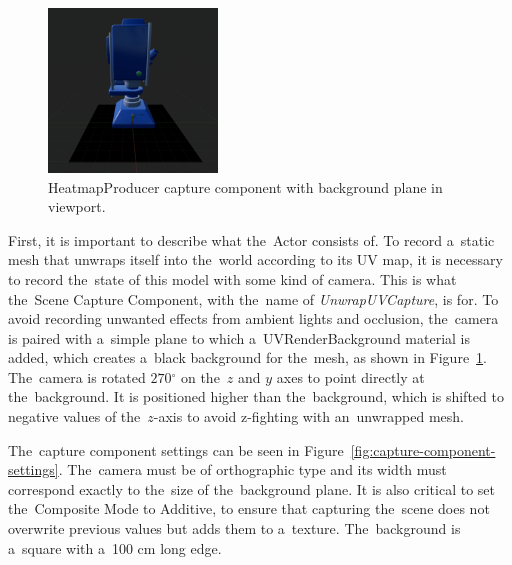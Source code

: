 \begin{figure}[!ht]
    \centering
    \includegraphics[width=0.4\textwidth]{img/heatmap-producer-viewport.png}
    \caption{HeatmapProducer capture component with background plane in viewport.}
    \label{fig:heatmap-producer-viewport}
\end{figure}

First, it is important to describe what the~Actor consists of. To record a~static mesh that unwraps itself into the~world according to its UV map, it is necessary to record the~state of this model with some kind of camera. This is what the~Scene Capture Component, with the~name of \emph{UnwrapUVCapture}, is for. To avoid recording unwanted effects from ambient lights and occlusion, the~camera is paired with a~simple plane to which a~UVRenderBackground material is added, which creates a~black background for the~mesh, as shown in Figure~\ref{fig:heatmap-producer-viewport}. The~camera is rotated $270{^\circ}$ on the~$z$ and $y$ axes to point directly at the~background. It is positioned higher than the~background, which is shifted to negative values of the~$z$-axis to avoid z-fighting with an~unwrapped mesh.  

The~capture component settings can be seen in Figure~\ref{fig:capture-component-settings}. The~camera must be of orthographic type and its width must correspond exactly to the~size of the~background plane. It is also critical to set the~Composite Mode to Additive, to ensure that capturing the~scene does not overwrite previous values but adds them to a~texture. The~background is a~square with a~100 cm long edge.

